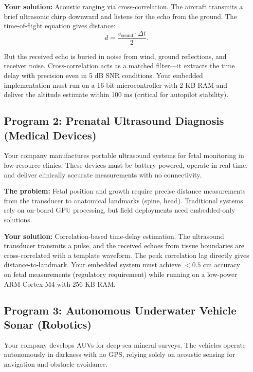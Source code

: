 \documentclass[11pt,letterpaper]{article}
\begin{document}
\textbf{Your solution:} Acoustic ranging via cross-correlation. The aircraft transmits a brief ultrasonic chirp downward and listens for the echo from the ground. The time-of-flight equation gives distance:
\begin{equation}
d = \frac{v_{\text{sound}} \cdot \Delta t}{2}.
\end{equation}

But the received echo is buried in noise from wind, ground reflections, and receiver noise. Cross-correlation acts as a matched filter—it extracts the time delay with precision even in 5 dB SNR conditions. Your embedded implementation must run on a 16-bit microcontroller with 2 KB RAM and deliver the altitude estimate within 100 ms (critical for autopilot stability).

\subsection{Program 2: Prenatal Ultrasound Diagnosis (Medical Devices)}

Your company manufactures portable ultrasound systems for fetal monitoring in low-resource clinics. These devices must be battery-powered, operate in real-time, and deliver clinically accurate measurements with no connectivity.

\textbf{The problem:} Fetal position and growth require precise distance measurements from the transducer to anatomical landmarks (spine, head). Traditional systems rely on on-board GPU processing, but field deployments need embedded-only solutions.

\textbf{Your solution:} Correlation-based time-delay estimation. The ultrasound transducer transmits a pulse, and the received echoes from tissue boundaries are cross-correlated with a template waveform. The peak correlation lag directly gives distance-to-landmark. Your embedded system must achieve $<0.5$ cm accuracy on fetal measurements (regulatory requirement) while running on a low-power ARM Cortex-M4 with 256 KB RAM.

\subsection{Program 3: Autonomous Underwater Vehicle Sonar (Robotics)}

Your company develops AUVs for deep-sea mineral surveys. The vehicles operate autonomously in darkness with no GPS, relying solely on acoustic sensing for navigation and obstacle avoidance.
\end{document}
